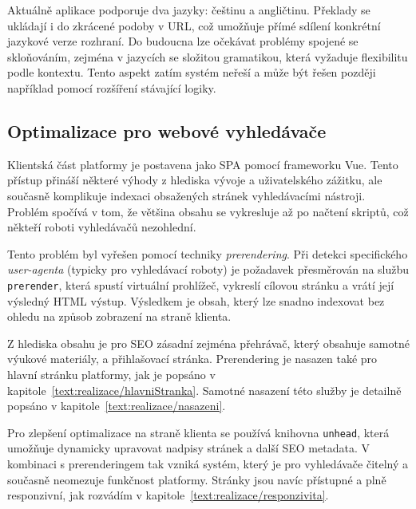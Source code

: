 Aktuálně aplikace podporuje dva jazyky: češtinu a angličtinu. 
Překlady se ukládají i do zkrácené podoby v URL, což umožňuje přímé sdílení konkrétní jazykové verze rozhraní. 
Do budoucna lze očekávat problémy spojené se skloňováním, zejména v jazycích se složitou gramatikou, která vyžaduje flexibilitu podle kontextu. 
Tento aspekt zatím systém neřeší a může být řešen později například pomocí rozšíření stávající logiky.


\subsection{Optimalizace pro webové vyhledávače}

Klientská část platformy je postavena jako SPA pomocí frameworku Vue. 
Tento přístup přináší některé výhody z hlediska vývoje a uživatelského zážitku, ale současně komplikuje indexaci obsažených stránek vyhledávacími nástroji. 
Problém spočívá v tom, že většina obsahu se vykresluje až po načtení skriptů, což někteří roboti vyhledávačů nezohlední.

Tento problém byl vyřešen pomocí techniky \textit{prerendering}.
Při detekci specifického \textit{user-agenta} (typicky pro vyhledávací roboty) je požadavek přesměrován na službu \texttt{prerender}, která spustí virtuální prohlížeč, vykreslí cílovou stránku a vrátí její výsledný HTML výstup.
Výsledkem je obsah, který lze snadno indexovat bez ohledu na způsob zobrazení na straně klienta.

Z hlediska obsahu je pro SEO zásadní zejména přehrávač, který obsahuje samotné výukové materiály, a přihlašovací stránka. 
Prerendering je nasazen také pro hlavní stránku platformy, jak je popsáno v kapitole~\ref{text:realizace/hlavniStranka}. 
Samotné nasazení této služby je detailně popsáno v kapitole~\ref{text:realizace/nasazeni}.

Pro zlepšení optimalizace na straně klienta se používá knihovna \texttt{unhead}, která umožňuje dynamicky upravovat nadpisy stránek a další SEO metadata. 
V kombinaci s prerenderingem tak vzniká systém, který je pro vyhledávače čitelný a současně neomezuje funkčnost platformy. 
Stránky jsou navíc přístupné a plně responzivní, jak rozvádím v kapitole~\ref{text:realizace/responzivita}.

